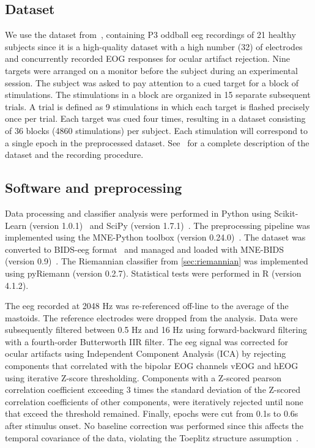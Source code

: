 	\subsection{Dataset}
	We use the dataset from~\textcite{Wittevrongel2016}, containing P3 oddball \ac{eeg}
	recordings of 21 healthy subjects since it is a high-quality dataset with a high
	number (32) of electrodes and concurrently recorded EOG responses for ocular artifact rejection.
	Nine targets were arranged on a monitor before the subject during an
	experimental session.
	The subject was asked to pay attention to a cued target for a block
	of stimulations.
	The stimulations in a block are organized in 15 separate subsequent trials.
	A trial is defined as 9 stimulations in which each target is flashed
	precisely once per trial.
	Each target was cued four times, resulting in a dataset consisting of 36 blocks
	(4860 stimulations) per subject.
	Each stimulation will correspond to a single epoch in the preprocessed dataset.
	See~\textcite{Wittevrongel2016} for a complete description of the dataset and the recording procedure.

	\subsection{Software and preprocessing}
	Data processing and classifier analysis were performed in Python using
	Scikit-Learn (version 1.0.1)~\cite{Pedregosa2011} and SciPy (version
	1.7.1)~\cite{Virtanen2020}.
	The preprocessing pipeline was implemented using the MNE-Python toolbox
	(version 0.24.0)~\cite{Gramfort2013}.
	The dataset was converted to BIDS-\ac{eeg} format~\cite{Pernet2019} and managed and
	loaded with MNE-BIDS (version 0.9)~\cite{Appelhoff2019}.
	The Riemannian classifier from \cref{sec:riemannian} was implemented using
	pyRiemann (version 0.2.7).
	Statistical tests were performed in R (version 4.1.2).

	The \ac{eeg} recorded at 2048 Hz was re-referenced off-line to the average of the mastoids.
	The reference electrodes were dropped from the analysis.
	Data were subsequently filtered between 0.5 Hz and 16 Hz using forward-backward
	filtering with a fourth-order Butterworth IIR filter.
	The \ac{eeg} signal was corrected for ocular artifacts using Independent Component
	Analysis (ICA) by rejecting components that correlated with the bipolar EOG
  channels vEOG and hEOG using iterative Z-score thresholding.
  Components with a Z-scored pearson correlation coefficient
  exceeding  3 times the standard deviation of the Z-scored
  correlation coefficients of other components, were iteratively
  rejected until none that exceed the threshold remained.
  Finally, epochs were cut from 0.1s to 0.6s after stimulus onset.
	No baseline correction was performed since this affects the temporal covariance
	of the data, violating the Toeplitz structure assumption~\cite{Bijma2003}.

